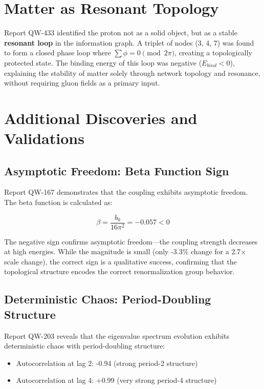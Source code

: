\documentclass[11pt, a4paper]{article}
\begin{document}
\section{Matter as Resonant Topology}

Report QW-433 identified the proton not as a solid object, but as a stable \textbf{resonant loop} in the information graph. A triplet of nodes (3, 4, 7) was found to form a closed phase loop where $\sum \phi = 0 \pmod{2\pi}$, creating a topologically protected state. The binding energy of this loop was negative ($E_{bind} < 0$), explaining the stability of matter solely through network topology and resonance, without requiring gluon fields as a primary input.

\section{Additional Discoveries and Validations}

\subsection{Asymptotic Freedom: Beta Function Sign}

Report QW-167 demonstrates that the coupling exhibits asymptotic freedom. The beta function is calculated as:

\begin{equation}
\beta = \frac{b_0}{16\pi^2} = -0.057 < 0
\label{eq:beta_function}
\end{equation}

The negative sign confirms asymptotic freedom—the coupling strength decreases at high energies. While the magnitude is small (only -3.3\% change for a 2.7$\times$ scale change), the correct sign is a qualitative success, confirming that the topological structure encodes the correct renormalization group behavior.

\subsection{Deterministic Chaos: Period-Doubling Structure}

Report QW-203 reveals that the eigenvalue spectrum evolution exhibits deterministic chaos with period-doubling structure:
\begin{itemize}
    \item Autocorrelation at lag 2: -0.94 (strong period-2 structure)
    \item Autocorrelation at lag 4: +0.99 (very strong period-4 structure)
\end{itemize}
\end{document}
